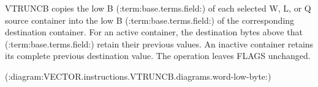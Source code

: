 VTRUNCB copies the low B (:term:base.terms.field:) of each selected W, L, or Q source container into
the low B (:term:base.terms.field:) of the corresponding destination container.  For an active
container, the destination bytes above that (:term:base.terms.field:) retain their previous values.
An inactive container retains its complete previous destination value.  The
operation leaves FLAGS unchanged.

(:diagram:VECTOR.instructions.VTRUNCB.diagrams.word-low-byte:)
